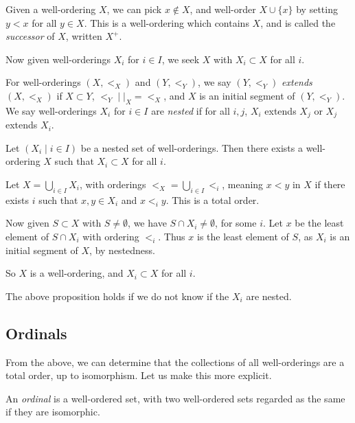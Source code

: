 \documentclass[12pt]{article}
\begin{document}
Given a well-ordering $X$, we can pick $x \not \in X$, and well-order $X \cup \{x\}$ by setting $y < x$ for all $y \in X$. This is a well-ordering which contains $X$, and is called the \emph{successor} of $X$, written $X^{+}$.

Now given well-orderings $X_i$ for $i \in I$, we seek $X$ with $X_i \subset X$ for all $i$.

For well-orderings $(X, <_X)$ and $(Y, <_Y)$, we say $(Y,<_Y)$ \emph{extends} $(X, <_X)$ if $X \subset Y$, $<_Y \mid|_X = <_X$, and $X$ is an initial segment of $(Y,<_Y)$. We say well-orderings $X_i$ for $i \in I$ are \emph{nested} if for all $i, j$, $X_i$ extends $X_j$ or $X_j$ extends $X_i$.

\begin{proposition}\label{prop:nest}
	Let $(X_i \mid i \in I)$ be a nested set of well-orderings. Then there exists a well-ordering $X$ such that $X_i \subset X$ for all $i$.
\end{proposition}

\begin{proofbox}
	Let $X = \bigcup_{i \in I} X_i$, with orderings $<_X = \bigcup_{i \in I}<_i$, meaning $x < y$ in $X$ if there exists $i$ such that $x, y \in X_i$ and $x <_i y$. This is a total order.

	Now given $S \subset X$ with $S \neq \emptyset$, we have $S \cap X_i \neq \emptyset$, for some $i$. Let $x$ be the least element of $S \cap X_i$ with ordering $<_i$. Thus $x$ is the least element of $S$, as $X_i$ is an initial segment of $X$, by nestedness.

	So $X$ is a well-ordering, and $X_i \subset X$ for all $i$.
\end{proofbox}

\begin{remark}
	The above proposition holds if we do not know if the $X_i$ are nested.
\end{remark}

\subsection{Ordinals}
\label{sub:ordinals}

From the above, we can determine that the collections of all well-orderings are a total order, up to isomorphism. Let us make this more explicit.

An \emph{ordinal} is a well-ordered set, with two well-ordered sets regarded as the same if they are isomorphic.
\end{document}
